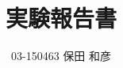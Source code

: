 \documentclass[uplatex,dvipdfmx]{jsarticle}
\begin{document}
\title{実験報告書}
\author{03-150463 保田 和彦}
\maketitle


\end{document}
